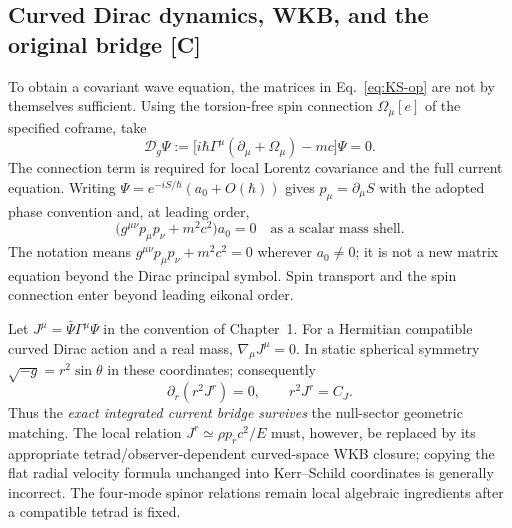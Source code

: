 \documentclass[11pt,a4paper]{article}
\begin{document}
\subsection{Curved Dirac dynamics, WKB, and the original bridge [C]}
To obtain a covariant wave equation, the matrices in Eq.~\eqref{eq:KS-op} are not by themselves sufficient. Using the torsion-free spin connection $\Omega_\mu[e]$ of the specified coframe, take
\begin{equation}\label{eq:matched-Dirac}
 \boxed{\mathcal D_g\Psi
 :=\bigl[i\hbar\Gamma^\mu(\partial_\mu+\Omega_\mu)-mc\bigr]\Psi=0.}
\end{equation}
The connection term is required for local Lorentz covariance and the full current equation. Writing $\Psi=e^{-iS/\hbar}(a_0+O(\hbar))$ gives $p_\mu=\partial_\mu S$ with the adopted phase convention and, at leading order,
\begin{equation}\label{eq:HJ-KS}
 \boxed{\bigl(g^{\mu\nu}p_\mu p_\nu+m^2c^2\bigr)a_0=0\quad\text{as a scalar mass shell}.}
\end{equation}
The notation means $g^{\mu\nu}p_\mu p_\nu+m^2c^2=0$ wherever $a_0\ne0$; it is not a new matrix equation beyond the Dirac principal symbol. Spin transport and the spin connection enter beyond leading eikonal order.

Let $J^\mu=\bar\Psi\Gamma^\mu\Psi$ in the convention of Chapter~1. For a Hermitian compatible curved Dirac action and a real mass, $\nabla_\mu J^\mu=0$. In static spherical symmetry $\sqrt{-g}=r^2\sin\theta$ in these coordinates; consequently
\begin{equation}\label{eq:curved-bridge}
 \boxed{\partial_r(r^2J^r)=0,\qquad r^2J^r=C_J.}
\end{equation}
Thus the \emph{exact integrated current bridge survives} the null-sector geometric matching. The local relation $J^r\simeq\rho p_r c^2/E$ must, however, be replaced by its appropriate tetrad/observer-dependent curved-space WKB closure; copying the flat radial velocity formula unchanged into Kerr--Schild coordinates is generally incorrect. The four-mode spinor relations remain local algebraic ingredients after a compatible tetrad is fixed.
\end{document}
